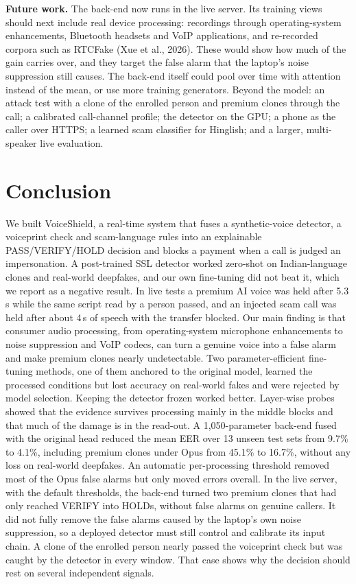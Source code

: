 \documentclass[10pt,a4paper,twocolumn]{article}
\begin{document}
\textbf{Future work.}
\label{sec:future}
The back-end now runs in the live server. Its training views should next include real device processing: recordings through operating-system enhancements, Bluetooth headsets and VoIP applications, and re-recorded corpora such as RTCFake (Xue et al., 2026). These would show how much of the gain carries over, and they target the false alarm that the laptop's noise suppression still causes. The back-end itself could pool over time with attention instead of the mean, or use more training generators. Beyond the model: an attack test with a clone of the enrolled person and premium clones through the call; a calibrated call-channel profile; the detector on the GPU; a phone as the caller over HTTPS; a learned scam classifier for Hinglish; and a larger, multi-speaker live evaluation.

\section{Conclusion}
We built VoiceShield, a real-time system that fuses a synthetic-voice detector, a voiceprint check and scam-language rules into an explainable PASS/VERIFY/HOLD decision and blocks a payment when a call is judged an impersonation. A post-trained SSL detector worked zero-shot on Indian-language clones and real-world deepfakes, and our own fine-tuning did not beat it, which we report as a negative result. In live tests a premium AI voice was held after 5.3\,s while the same script read by a person passed, and an injected scam call was held after about 4\,s of speech with the transfer blocked. Our main finding is that consumer audio processing, from operating-system microphone enhancements to noise suppression and VoIP codecs, can turn a genuine voice into a false alarm and make premium clones nearly undetectable. Two parameter-efficient fine-tuning methods, one of them anchored to the original model, learned the processed conditions but lost accuracy on real-world fakes and were rejected by model selection. Keeping the detector frozen worked better. Layer-wise probes showed that the evidence survives processing mainly in the middle blocks and that much of the damage is in the read-out. A 1,050-parameter back-end fused with the original head reduced the mean EER over 13 unseen test sets from 9.7\% to 4.1\%, including premium clones under Opus from 45.1\% to 16.7\%, without any loss on real-world deepfakes. An automatic per-processing threshold removed most of the Opus false alarms but only moved errors overall. In the live server, with the default thresholds, the back-end turned two premium clones that had only reached VERIFY into HOLDs, without false alarms on genuine callers. It did not fully remove the false alarms caused by the laptop's own noise suppression, so a deployed detector must still control and calibrate its input chain. A clone of the enrolled person nearly passed the voiceprint check but was caught by the detector in every window. That case shows why the decision should rest on several independent signals.
\end{document}
